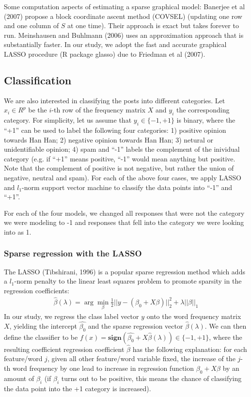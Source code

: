 \documentclass[11pt]{article}
\newcommand{\1}[1]{{\mathbf 1}\left\{#1\right\}}        %
\begin{document}
Some computation aspects of estimating a sparse graphical model: Banerjee et al (2007) propose a block coordinate ascent method (COVSEL) (updating one row and one column of $S$ at one time). Their approach is exact but takes forever to run. Meinshausen and Buhlmann (2006) uses an approximation approach that is substantially faster. In our study, we adopt the fast and accurate graphical LASSO procedure (R package glasso) due to Friedman et al (2007).  

\subsection{Classification}
We are also interested in classifying the posts into different categories. Let $x_i\in R^{p}$ be the $i$-th row of the frequency matrix $X$ and $y_i$ the corresponding category. For simplicity, let us assume that $y_i\in\{-1,+1\}$ is binary, where the ``+1'' can be used to label the following four categories: 1) positive opinion towards Han Han; 2) negative opinion towards Han Han; 3) netural or unidentifiable opinion; 4) spam and ``-1'' labels the complement of the inividual category (e.g. if ``+1'' means positive, ``-1'' would mean anything but positive. Note that the complement of positive is not negative, but rather the union of negative, neutral and spam). For each of the above four cases, we apply LASSO and $l_1$-norm support vector machine to classify the data points into ``-1'' and ``+1''.  

For each of the four models, we changed all responses that were not the category we were modeling to -1 and responses that fell into the category we were looking into as 1.  
\subsubsection{Sparse regression with the LASSO}
The LASSO (Tibshirani, 1996) is a popular sparse regression method which adds a $l_1$-norm penalty to the linear least squares problem to promote sparsity in the regression coefficients:
\begin{align}
\label{eq:Lasso}
\hat{\beta}(\lambda) = \arg \min_\beta \frac{1}{2}||y-(\beta_0+X\beta)||_2^2 + \lambda ||\beta||_1
\end{align}
In our study, we regress the class label vector $y$ onto the word frequency matrix $X$, yielding the intercept $\hat{\beta_0}$ and the sparse regression vector $\hat{\beta}(\lambda)$. We can then define the classifier to be $f(x) = \textbf{sign}(\hat{\beta_0}+X\hat{\beta}(\lambda))\in\{-1,+1\}$, where the resulting coefficient regression coefficient $\hat{\beta}$ has the following explanation: for each feature/word $j$, given all other feature/word variable fixed, the increase of the $j$-th word frequency by one lead to increase in regression function $\beta_0+X\beta$ by an amount of $\beta_i$ (if $\beta_i$ turns out to be positive, this means the chance of classifying the data point into the +1 category is increased).
\end{document}
